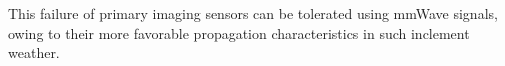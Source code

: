 







\iffalse

This failure of primary imaging sensors can be tolerated using mmWave signals, owing to their more favorable propagation characteristics in such inclement weather.


